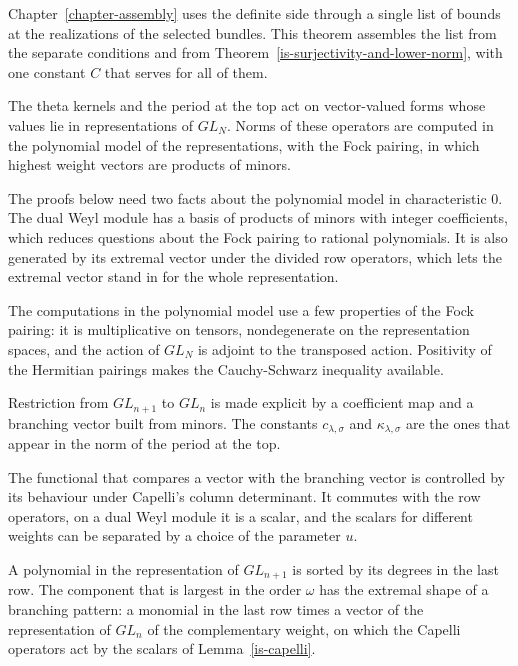 Chapter~\ref{chapter-assembly} uses the definite side through a single list of bounds at the
realizations of the selected bundles. This theorem assembles the list from the separate conditions
and from Theorem~\ref{is-surjectivity-and-lower-norm}, with one constant $C$ that serves for all of
them.

The theta kernels and the period at the top act on vector-valued forms whose values lie in
representations of $GL_N$. Norms of these operators are computed in the polynomial model of the
representations, with the Fock pairing, in which highest weight vectors are products of minors.

The proofs below need two facts about the polynomial model in characteristic $0$. The dual Weyl
module has a basis of products of minors with integer coefficients, which reduces questions about
the Fock pairing to rational polynomials. It is also generated by its extremal vector under the
divided row operators, which lets the extremal vector stand in for the whole representation.

The computations in the polynomial model use a few properties of the Fock pairing: it is
multiplicative on tensors, nondegenerate on the representation spaces, and the action of $GL_N$ is
adjoint to the transposed action. Positivity of the Hermitian pairings makes the Cauchy-Schwarz
inequality available.

Restriction from $GL_{n+1}$ to $GL_n$ is made explicit by a coefficient map and a branching vector
built from minors. The constants $c_{\lambda,\sigma}$ and $\kappa_{\lambda,\sigma}$ are the ones that
appear in the norm of the period at the top.

The functional that compares a vector with the branching vector is controlled by its behaviour under
Capelli's column determinant. It commutes with the row operators, on a dual Weyl module it is a
scalar, and the scalars for different weights can be separated by a choice of the parameter $u$.

A polynomial in the representation of $GL_{n+1}$ is sorted by its degrees in the last row. The
component that is largest in the order $\omega$ has the extremal shape of a branching pattern: a
monomial in the last row times a vector of the representation of $GL_n$ of the complementary weight,
on which the Capelli operators act by the scalars of Lemma~\ref{is-capelli}.

